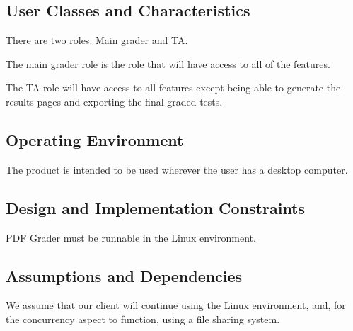 \subsection{User Classes and Characteristics}
There are two roles: Main grader and TA. \par 
The main grader role is the role that will have access to all of the features. \par
The TA role will have access to all features except being able to generate the results pages and exporting the final graded tests.

\subsection{Operating Environment}
The product is intended to be used wherever the user has a desktop computer.

\subsection{Design and Implementation Constraints}
PDF Grader must be runnable in the Linux environment.

\subsection{Assumptions and Dependencies}
%
We assume that our client will continue using the Linux environment, and, for the concurrency aspect to function, using a file sharing system.
